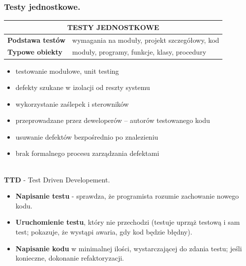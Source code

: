 \documentclass[12pt]{article}
\begin{document}
    \subsubsection{Testy jednostkowe.}

    \begin{table}[H]
        \begin{center}
            \begin{tabular}{| p{4cm}| p{12cm}|}
                \hline
                \multicolumn{2}{|c|}{ \textbf{TESTY JEDNOSTKOWE}}\\
                \hline
                \textbf{Podstawa testów} & wymagania na moduły, projekt szczegółowy, kod\\
                \hline
                \textbf{Typowe obiekty} & moduły, programy, funkcje, klasy, procedury\\
                \hline
            \end{tabular}
        \end{center}
    \end{table}


    \begin{itemize}
        \item testowanie modułowe, unit testing
        \item defekty szukane w izolacji od reszty systemu
        \item wykorzystanie zaślepek i sterowników
        \item przeprowadzane przez deweloperów – autorów testowanego kodu
        \item usuwanie defektów bezpośrednio po znalezieniu
        \item brak formalnego procesu zarządzania defektami
    \end{itemize}

    \hfill \\

    \noindent \textbf{TTD} - Test Driven Developement.
    \begin{itemize}
        \item \textbf{Napisanie testu} - sprawdza, że programista rozumie zachowanie nowego kodu.
        \item \textbf{Uruchomienie testu}, który nie przechodzi (testuje uprząż testową i sam test; pokazuje,
        że wystąpi awaria, gdy kod będzie błędny).
        \item \textbf{Napisanie kodu} w minimalnej ilości, wystarczającej do zdania testu; jeśli
        konieczne, dokonanie refaktoryzacji.
    \end{itemize}
\end{document}
